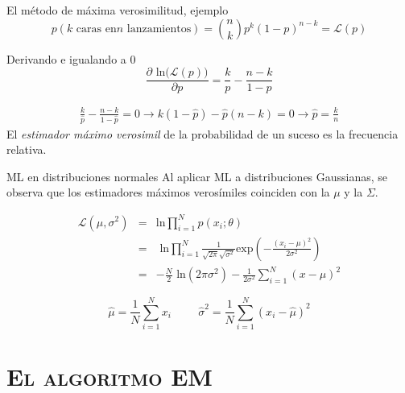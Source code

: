 \documentclass[xcolor=x11names,compress]{beamer}
\renewcommand{\(}{\begin{columns}}
\renewcommand{\)}{\end{columns}}
\newcommand{\<}[1]{\begin{column}{#1}}
\renewcommand{\>}{\end{column}}
\begin{document}
\begin{frame}{El método de máxima verosimilitud, ejemplo}
\begin{equation}
p(k \text{ caras en} n \text{ lanzamientos}) = {n \choose k} p^k (1 - p)^{n-k} = \mathcal{L}(p)
\end{equation}

Derivando e igualando a 0
\begin{equation}
\frac{\partial \text{ ln}\big ( \mathcal{L}(p)  \big )}{\partial p} = \frac{k}{p} - \frac{n-k}{1-p}
\label{eq:pasos-frec-2}
\end{equation}

\begin{eqnarray}
\frac{k}{\hat{p}} - \frac{n-k}{1-\hat{p}} = 0 \to k(1-\hat{p}) - \hat{p}(n-k) = 0 \label{eq:pasos-frec-3} \to \hat{p} = \frac{k}{n}
\label{eq:pasos-frec-4}
\end{eqnarray}
 El \emph{estimador máximo verosimil} de la probabilidad de un suceso es la frecuencia relativa.
\end{frame}

\begin{frame}{ML en distribuciones normales}
Al aplicar ML a distribuciones Gaussianas, se observa que los estimadores máximos verosímiles coinciden con la $\mu$ y la $\Sigma$.

\begin{eqnarray}
\mathcal{L}(\mu,\sigma ^2) &=& \text{ln}\prod_{i=1}^N p(x_i;\theta) \label{eq:pasos-1} \\ &=& \text{ ln}\prod_{i=1}^N \frac{1}{\sqrt{2 \pi}\sqrt{\sigma ^2}} \text{exp} \left ( -\frac{(x_i - \mu)^2}{2 \sigma ^2}  \right ) \label{eq:pasos-2} \\ &=&
-\frac{N}{2} \text{ ln}(2\pi \sigma ^2) - \frac{1}{2 \sigma ^2} \sum_{i=1}^{N}(x - \mu)^2 \label{eq:pasos-3}
\end{eqnarray}

\begin{equation}
\hat{\mu} = \frac{1}{N}\sum_{i=1}^{N}x_i \hspace{1cm} \hat{\sigma}^2 = \frac{1}{N}\sum_{i=1}^{N}(x_i - \hat{\mu})^2
\label{eq:media}
\end{equation}

\end{frame}

\section{\scshape El algoritmo EM}
\end{document}
